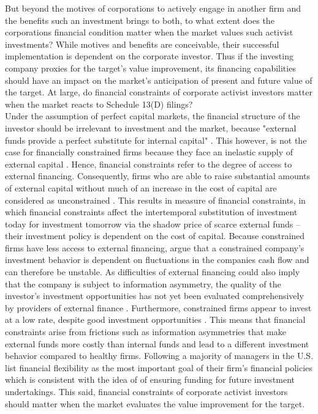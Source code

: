 \documentclass[12pt]{article}
\begin{document}
But beyond the motives of corporations to actively engage in another firm and the benefits such an investment brings to both, to what extent does the corporations financial condition matter when the market values such activist investments?  While motives and benefits are conceivable, their successful implementation is dependent on the corporate investor. 
Thus if the investing company proxies for the target's value improvement, its financing capabilities should have an impact on the market's anticipation of present and future value of the target. At large, do financial constraints of corporate activist investors matter when the market reacts to Schedule 13(D) filings?\\
Under the assumption of perfect capital markets, the financial structure of the investor should be irrelevant to investment and the market, because "external funds provide a perfect substitute for internal capital" \citep[p. 141]{Fazzari1988}. This however, is not the case for financially constrained firms because they face an inelastic supply of external capital \citep[p.1]{Farre-mensa2013}. Hence, financial constraints refer to the degree of access to external financing. Consequently, firms who are able to raise substantial amounts of external capital without much of an increase in the cost of capital are considered as unconstrained \citep[p.1]{Farre-mensa2013}. This results in \citet[p.531]{Whited2006} measure of financial constraints, in which financial constraints affect the intertemporal substitution of investment today for investment tomorrow via the shadow price of scarce external funds -- their investment policy is dependent on the cost of capital. Because constrained firms have less access to external financing, \citet[p. 142]{Fazzari1988} argue that a constrained company's investment behavior is dependent on fluctuations in the companies cash flow and can therefore be unstable. As difficulties of external financing could also imply that the company is subject to information asymmetry, the quality of the investor's investment opportunities has not yet been evaluated comprehensively by providers of external finance \citep[p.142]{Fazzari1988}. Furthermore, constrained firms appear to invest at a low rate, despite good investment opportunities \citep[p.533]{Whited2006}. This means that financial constraints arise from frictions such as information asymmetries that make external funds more costly than internal funds and lead to a different investment behavior compared to healthy firms. 
Following \citet[p.691]{Almeida2011a} a majority of managers in the U.S. list financial flexibility as the most important goal of their firm's financial policies which is consistent with the idea of of ensuring funding for future investment undertakings. This said, financial constraints of corporate activist investors should matter when the market evaluates the value improvement for the target.
\end{document}
